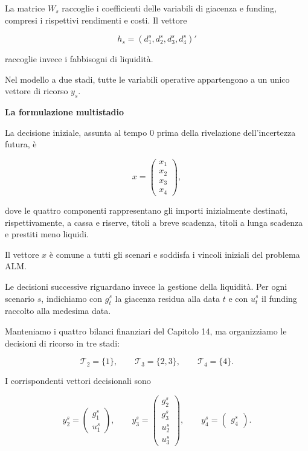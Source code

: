 La matrice $W_s$ raccoglie i coefficienti
delle variabili di giacenza e funding,
compresi i rispettivi rendimenti e costi.
Il vettore

\[
h_s=(d_1^s,d_2^s,d_3^s,d_4^s)'
\]

\noindent raccoglie invece i fabbisogni di liquidit\`a.

Nel modello a due stadi, tutte le variabili
operative appartengono a un unico vettore
di ricorso $y_s$.

\medskip

\noindent
\medskip

\noindent
\textbf{La formulazione multistadio}

La decisione iniziale, assunta al tempo $0$ prima
della rivelazione dell'incertezza futura, \`e

\[
x=
\begin{pmatrix}
x_1\\
x_2\\
x_3\\
x_4
\end{pmatrix},
\]

\noindent dove le quattro componenti rappresentano
gli importi inizialmente destinati, rispettivamente,
a cassa e riserve, titoli a breve scadenza,
titoli a lunga scadenza e prestiti meno liquidi.

Il vettore $x$ \`e comune a tutti gli scenari
e soddisfa i vincoli iniziali del problema ALM.

Le decisioni successive riguardano invece
la gestione della liquidit\`a. Per ogni
scenario $s$, indichiamo con $g_t^s$
la giacenza residua alla data $t$
e con $u_t^s$ il funding raccolto
alla medesima data.

Manteniamo i quattro bilanci finanziari
del Capitolo 14, ma organizziamo
le decisioni di ricorso in tre stadi:

\[
\mathcal T_2=\{1\},
\qquad
\mathcal T_3=\{2,3\},
\qquad
\mathcal T_4=\{4\}.
\]

I corrispondenti vettori decisionali sono

\[
y_2^s=
\begin{pmatrix}
g_1^s\\
u_1^s
\end{pmatrix},
\qquad
y_3^s=
\begin{pmatrix}
g_2^s\\
g_3^s\\
u_2^s\\
u_3^s
\end{pmatrix},
\qquad
y_4^s=
\begin{pmatrix}
g_4^s
\end{pmatrix}.
\]

